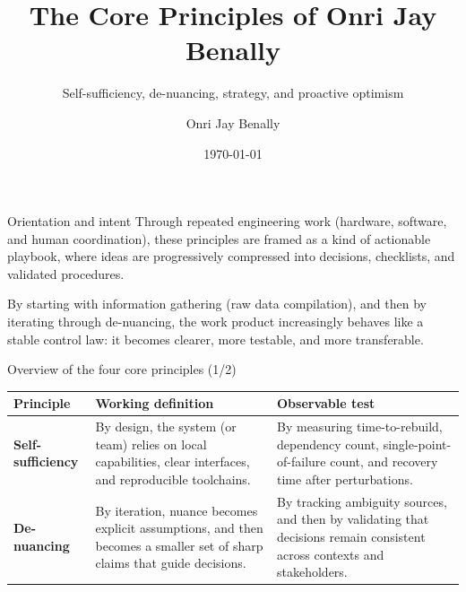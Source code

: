 \documentclass[presentation,aspectratio=169,11pt]{beamer}
\title[Core Principles]{The Core Principles of Onri Jay Benally}
\subtitle{Self-sufficiency, de-nuancing, strategy, and proactive optimism}
\author{Onri Jay Benally}
\date{\today}
\newcommand{\KeyTerm}[1]{\textbf{#1}}
\begin{document}
\begin{frame}[plain]
  \titlepage
\end{frame}

\begin{frame}{Orientation and intent}
\justifying
Through repeated engineering work (hardware, software, and human coordination), these principles are framed as a kind of actionable playbook, where ideas are progressively compressed into decisions, checklists, and validated procedures.

\vspace{0.75em}
\begin{block}{}
\justifying
By starting with information gathering (raw data compilation), and then by iterating through de-nuancing, the work product increasingly behaves like a stable control law: it becomes clearer, more testable, and more transferable.
\end{block}
\end{frame}

\begin{frame}{Overview of the four core principles (1/2)}
\justifying
\begin{table}
\scriptsize
\begin{tabularx}{\linewidth}{@{}l X X@{}}
\toprule
\textbf{Principle} & \textbf{Working definition} & \textbf{Observable test}\\
\midrule
\KeyTerm{Self-sufficiency} & By design, the system (or team) relies on local capabilities, clear interfaces, and reproducible toolchains. & By measuring time-to-rebuild, dependency count, single-point-of-failure count, and recovery time after perturbations.\\
\addlinespace
\KeyTerm{De-nuancing} & By iteration, nuance becomes explicit assumptions, and then becomes a smaller set of sharp claims that guide decisions. & By tracking ambiguity sources, and then by validating that decisions remain consistent across contexts and stakeholders.\\
\bottomrule
\end{tabularx}
\end{table}
\end{frame}
\end{document}
